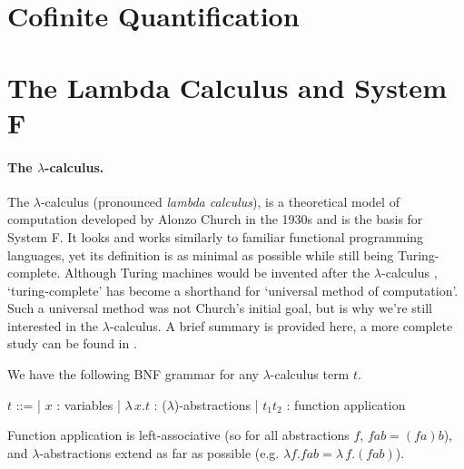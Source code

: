 \documentclass[logo,bsc,singlespacing,parskip,online]{infthesis}
\renewenvironment{code}{\mintedcopy[breaklines,breaksymbolleft=\;]{agda}}{\endmintedcopy}
\begin{document}
\begin{comment}
-- Import list membership using List Char comparisons.
_≟lchar_ : ∀ (xs ys : List Char) → Dec (xs ≡ ys)
xs ≟lchar ys = ≡-dec (_≟char_) xs ys

open DecPropMembership _≟lchar_ using (_∈_; _∉_; _∈?_)
\end{code}

Include some infixes.

\begin{code}
infix 4 _—→_
\end{code}
\end{comment}

\section{Cofinite Quantification}



\section{The Lambda Calculus and System F}

\paragraph*{The $\lambda$-calculus.}
The $\lambda$-calculus (pronounced \textit{lambda calculus}), is a theoretical model of computation
developed by Alonzo Church in the 1930s \citep{church_set_1932} and is the basis for System F. It
looks and works similarly to familiar functional programming languages, yet its definition is as
minimal as possible while still being Turing-complete. Although Turing machines would be invented
after the $\lambda$-calculus \citep{turing_computable_1937}, `turing-complete' has become a
shorthand for `universal method of computation'. Such a universal method was not Church's initial
goal, but is why we're still interested in the $\lambda$-calculus. A brief summary is provided here,
a more complete study can be found in \cite{pierce_types_2002}.

We have the following BNF grammar for any $\lambda$-calculus term $t$.
\begin{center}
\begin{bnf}
  $t$ ::=
  | $x$ : variables
  | $\lambda \, x. t$ : ($\lambda$)-abstractions
  | $t_1 t_2$ : function application
\end{bnf}
\end{center}

Function application is left-associative (so for all abstractions $f$, $f a b = (f a) b$), and
$\lambda$-abstractions extend as far as possible (e.g. $\lambda f. f a b = \lambda \, f. (f a b)$).
\end{document}
